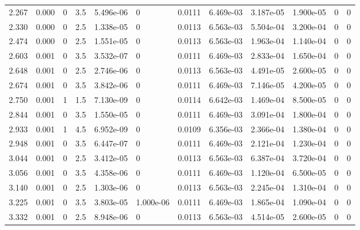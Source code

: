\documentclass[preview]{standalone}
\begin{document}
{{\begin{tabular}{L{1.2cm}C{1.2cm} C{0.3cm}C{0.5cm} C{1.4cm}C{1.4cm} C{1.4cm}C{1.4cm} C{1.6cm}C{1.6cm} C{1.6cm}C{1.6cm}}
  2.267  &  0.000  & 0     & 3.5 &  5.496e-06  & 0  &  0.0111&   6.469e-03& 3.187e-05 & 1.900e-05   &  0 & 0  \\ 
  2.330  &  0.000  & 0     & 2.5 &  1.338e-05  & 0  &  0.0113&   6.563e-03& 5.504e-04 & 3.200e-04   &  0 & 0  \\ 
  2.474  &  0.000  & 0     & 2.5 &  1.551e-05  & 0  &  0.0113&   6.563e-03& 1.963e-04 & 1.140e-04   &  0 & 0  \\ 
  2.603  &  0.001  & 0     & 3.5 &  3.532e-07  & 0  &  0.0111&   6.469e-03& 2.833e-04 & 1.650e-04   &  0 & 0  \\ 
  2.648  &  0.001  & 0     & 2.5 &  2.746e-06  & 0  &  0.0113&   6.563e-03& 4.491e-05 & 2.600e-05   &  0 & 0  \\ 
  2.674  &  0.001  & 0     & 3.5 &  3.842e-06  & 0  &  0.0111&   6.469e-03& 7.146e-05 & 4.200e-05   &  0 & 0  \\ 
  2.750  &  0.001  & 1     & 1.5 &  7.130e-09  & 0  &  0.0114&   6.642e-03& 1.469e-04 & 8.500e-05   &  0 & 0  \\ 
  2.844  &  0.001  & 0     & 3.5 &  1.550e-05  & 0  &  0.0111&   6.469e-03& 3.091e-04 & 1.800e-04   &  0 & 0  \\ 
  2.933  &  0.001  & 1     & 4.5 &  6.952e-09  & 0  &  0.0109&   6.356e-03& 2.366e-04 & 1.380e-04   &  0 & 0  \\ 
  2.948  &  0.001  & 0     & 3.5 &  6.447e-07  & 0  &  0.0111&   6.469e-03& 2.121e-04 & 1.230e-04   &  0 & 0  \\ 
  3.044  &  0.001  & 0     & 2.5 &  3.412e-05  & 0  &  0.0113&   6.563e-03& 6.387e-04 & 3.720e-04   &  0 & 0  \\ 
  3.056  &  0.001  & 0     & 3.5 &  4.358e-06  & 0  &  0.0111&   6.469e-03& 1.120e-04 & 6.500e-05   &  0 & 0  \\ 
  3.140  &  0.001  & 0     & 2.5 &  1.303e-06  & 0  &  0.0113&   6.563e-03& 2.245e-04 & 1.310e-04   &  0 & 0  \\ 
  3.225  &  0.001  & 0     & 3.5 &  3.803e-05  & 1.000e-06  &  0.0111&   6.469e-03& 1.865e-04 & 1.090e-04   &  0 & 0  \\ 
  3.332  &  0.001  & 0     & 2.5 &  8.948e-06  & 0  &  0.0113&   6.563e-03& 4.514e-05 & 2.600e-05   &  0 & 0  \\ 
\hline 
\end{tabular} 

}}
\end{document}
